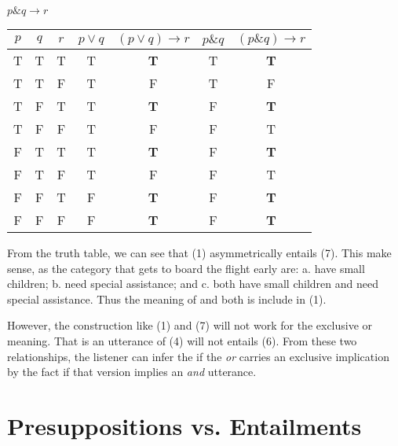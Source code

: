 \documentclass{article}
\begin{document}
$ p \& q \rightarrow r$
\begin{center}
\begin{tabular}{ccc|cc|cc}
    $p$     & $q$     & $r$   &  $p \lor q$ &  $(p \lor q) \rightarrow r$          & $p \& q$  & $(p \& q) \rightarrow r$               \\ \hline
    T       & T       & T     & T           & \textbf{T}                                     & T         & \textbf{T}                    \\
    T       & T       & F     & T           & F                                     & T         & F                    \\
    T       & F       & T     & T           & \textbf{T}                                     & F         & \textbf{T}                    \\
    T       & F       & F     & T           & F                                     & F         & T                    \\
    F       & T       & T     & T           & \textbf{T}                                     & F         & \textbf{T}                    \\
    F       & T       & F     & T           & F                                     & F         & T                    \\
    F       & F       & T     & F           & \textbf{T}                                     & F         & \textbf{T}                    \\
    F       & F       & F     & F           & \textbf{T}                                     & F         & \textbf{T}                    \\
\end{tabular}
\end{center}

From the truth table, we can see that (1) asymmetrically entails (7). This make sense, as the category that gets to board the flight early are: a. have small children; b. need special assistance; and c. both have small children and need special assistance. Thus the meaning of and both is include in (1). 

However, the construction like (1) and (7) will not work for the exclusive or meaning. That is an utterance of (4) will not entails (6). From these two relationships, the listener can infer the if the \textit{or} carries an exclusive implication by the fact if that version implies an \textit{and} utterance.

\section{Presuppositions vs. Entailments}
\end{document}
